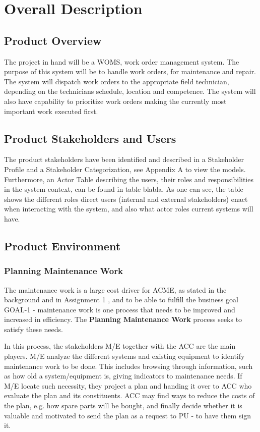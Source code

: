 \section{Overall Description}
\label{sec:overall_description}
\subsection{Product Overview}
The project in hand will be a WOMS, work order management system.  The purpose of this system will be to handle work orders, for maintenance and repair. The system will dispatch work orders to the appropriate field technician, depending on the technicians schedule, location and competence. The system will also have capability to prioritize  work orders  making the currently  most important work executed first.  

\subsection{Product Stakeholders and Users}
The product stakeholders have been identified and described in a Stakeholder Profile and a Stakeholder Categorization, see Appendix A to view the models. Furthermore, an Actor Table describing the users, their roles and responsibilities in the system context, can be found in table blabla. As one can see, the table shows the different roles direct users (internal and external stakeholders) enact when interacting with the system, and also what actor roles current systems will have. 
\subsection{Product Environment}

\subsubsection{Planning Maintenance Work}
\label{sec:bp1}
The maintenance work is a large cost driver for ACME, as stated in the background and in Assignment 1 \cite{ass1}, and to be able to fulfill the business goal GOAL-1 - maintenance work is one process that needs to be improved and increased in efficiency. The \textbf{Planning Maintenance Work} process seeks to satisfy these needs. 

In this process, the stakeholders M/E together with the ACC are the main players. M/E analyze the different systems and existing equipment to identify maintenance work to be done. This includes browsing through information, such as how old a system/equipment is, giving indicators to maintenance needs. If M/E locate such necessity, they project a plan and handing it over to ACC who evaluate the plan and its constituents. ACC may find ways to reduce the costs of the plan, e.g. how spare parts will be bought, and finally decide whether it is valuable and motivated to send the plan as a request to PU - to have them sign it.

